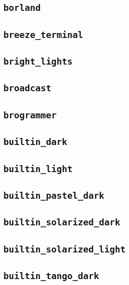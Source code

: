 \subsection{\texttt{borland}}
\newpage
\subsection{\texttt{breeze\_terminal}}
\newpage
\subsection{\texttt{bright\_lights}}
\newpage
\subsection{\texttt{broadcast}}
\newpage
\subsection{\texttt{brogrammer}}
\newpage
\subsection{\texttt{builtin\_dark}}
\newpage
\subsection{\texttt{builtin\_light}}
\newpage
\subsection{\texttt{builtin\_pastel\_dark}}
\newpage
\subsection{\texttt{builtin\_solarized\_dark}}
\newpage
\subsection{\texttt{builtin\_solarized\_light}}
\newpage
\subsection{\texttt{builtin\_tango\_dark}}
\newpage
